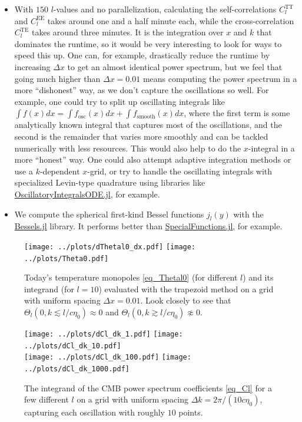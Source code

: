 \documentclass[10pt,a4paper]{article}
\begin{document}
\begin{itemize}
\item
With $150$ $l$-values and no parallelization,
calculating the self-correlations $C_l^\text{TT}$ and $C_l^\text{EE}$ takes around one and a half minute each,
while the cross-correlation $C_l^\text{TE}$ takes around three minutes.
It is the integration over $x$ and $k$ that dominates the runtime,
so it would be very interesting to look for ways to speed this up.
One can, for example, drastically reduce the runtime by increasing $\Delta x$ to get an almost identical power spectrum,
but we feel that going much higher than $\Delta x = 0.01$ means computing the power spectrum in a more ``dishonest'' way,
as we don't capture the oscillations so well.
For example, one could try to split up oscillating integrals like
$\int f(x) dx = \int f_\text{osc}(x) dx + \int f_\text{smooth}(x) dx$,
where the first term is some analytically known integral that captures most of the oscillations,
and the second is the remainder that varies more smoothly and can be tackled numerically with less resources.
This would also help to do the $x$-integral in a more ``honest'' way.
One could also attempt adaptive integration methods or use a $k$-dependent $x$-grid,
or try to handle the oscillating integrals with specialized Levin-type quadrature using libraries like
\href{https://github.com/xzackli/OscillatoryIntegralsODE.jl}{OscillatoryIntegralsODE.jl}, for example.

\item
We compute the spherical first-kind Bessel functions $j_l(y)$ with the \href{https://github.com/JuliaMath/Bessels.jl}{Bessels.jl} library.
It performs better than \href{https://github.com/JuliaMath/SpecialFunctions.jl}{SpecialFunctions.jl}, for example.
\end{itemize}

\begin{figure}[ph]
\centering
\texttt{[image: ../plots/dThetal0\_dx.pdf]} \hfill
\texttt{[image: ../plots/Theta0.pdf]}
\caption{
	Today's temperature monopoles \eqref{eq_Thetal0} (for different $l$) and its integrand (for $l=10$) evaluated with the trapezoid method on a grid with uniform spacing $\Delta x = 0.01$.
	Look closely to see that
	$\Theta_l(0,k\lesssim l / c \eta_0) \approx 0$ and
	$\Theta_l(0,k\gtrsim l / c \eta_0) \not\approx 0$.
}
\label{fig_Theta0}

\bigskip \bigskip \bigskip

\texttt{[image: ../plots/dCl\_dk\_1.pdf]} \hfill
\texttt{[image: ../plots/dCl\_dk\_10.pdf]} \\
\texttt{[image: ../plots/dCl\_dk\_100.pdf]} \hfill
\texttt{[image: ../plots/dCl\_dk\_1000.pdf]}
\caption{The integrand of the CMB power spectrum coefficients \eqref{eq_Cl} for a few different $l$ on a grid with uniform spacing $\Delta k = 2\pi/(10c\eta_0)$, capturing each oscillation with roughly $10$ points.}
\label{fig_dCl_dk}
\end{figure}
\end{document}

